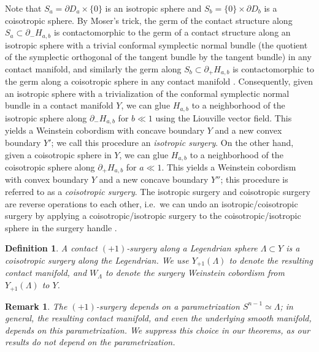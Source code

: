 \documentclass[11pt]{amsart}
\numberwithin{equation}{section}
\newtheorem{definition}[theorem]{\textbf{Definition}}
\newtheorem{remark}[theorem]{\textbf{Remark}}
\begin{document}
Note that $S_a=\partial D_a \times \{0\}$ is an isotropic sphere and $S_b=\{0\} \times \partial D_b$ is a coisotropic sphere. By Moser's trick, the germ of the contact structure along $S_a\subset \partial_-H_{a,b}$ is contactomorphic to the germ of a contact structure along an isotropic sphere with a trivial conformal symplectic normal bundle (the quotient of the symplectic orthogonal of the tangent bundle by the tangent bundle) in any contact manifold, and similarly the germ along $S_b\subset \partial_+H_{a,b}$ is contactomorphic to the germ along a coisotropic sphere in any contact manifold \cite[Lemma 3.4]{zbMATH07206659}. Consequently, given an isotropic sphere with a trivialization of the conformal symplectic normal bundle in a contact manifold $Y$, we can glue $H_{a,b}$ to a neighborhood of the isotropic sphere along $\partial_-H_{a,b}$ for $b\ll 1$ using the Liouville vector field. This yields a Weinstein cobordism with concave boundary $Y$ and a new convex boundary $Y'$; we call this procedure an \emph{isotropic surgery}. On the other hand, given a coisotropic sphere in $Y$, we can glue $H_{a,b}$ to a neighborhood of the coisotropic sphere along $\partial_+H_{a,b}$ for $a\ll 1$. This yields a Weinstein cobordism with convex boundary $Y$ and a new concave boundary $Y''$; this procedure is referred to as a \emph{coisotropic surgery}. The isotropic surgery and coisotropic surgery are reverse operations to each other, i.e.\ we can undo an isotropic/coisotropic surgery by applying a coisotropic/isotropic surgery to the coisotropic/isotropic sphere in the surgery handle \cite[Lemma 3.9, Proposition 3.10]{zbMATH07206659}. 


\begin{definition}
A contact $(+1)$-surgery along a Legendrian sphere $\Lambda \subset Y$ is a coisotropic surgery along the Legendrian. We use $Y_{+1}(\Lambda)$ to denote the resulting contact manifold, and $W_{\Lambda}$ to denote the surgery Weinstein cobordism from $Y_{+1}(\Lambda)$ to $Y$.  
\end{definition}

\begin{remark}
    The $(+1)$-surgery depends on a parametrization $S^{n-1}\simeq \Lambda$; in general, the resulting contact manifold, and even the underlying smooth manifold, depends on this parametrization. We suppress this choice in our theorems, as our results do not depend on the parametrization.
\end{remark}
\end{document}
